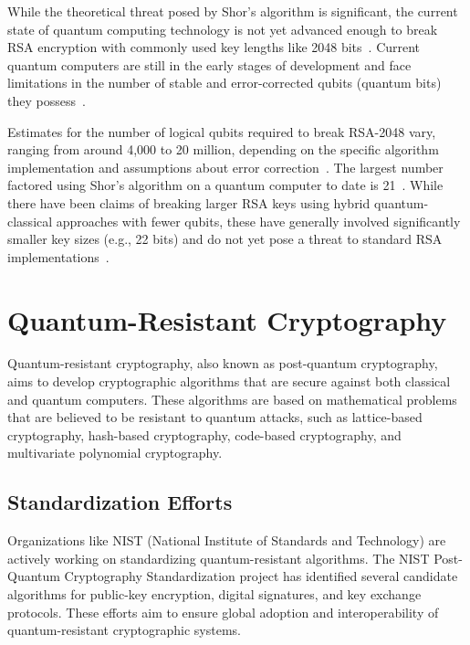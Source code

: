 \documentclass[12pt,a4paper]{report}
\begin{document}
While the theoretical threat posed by Shor's algorithm is significant, the current state of quantum computing technology is not yet advanced enough to break RSA encryption with commonly used key lengths like 2048 bits~\cite{SpinQShor}. Current quantum computers are still in the early stages of development and face limitations in the number of stable and error-corrected qubits (quantum bits) they possess~\cite{CatoNetworks}.

Estimates for the number of logical qubits required to break RSA-2048 vary, ranging from around 4,000 to 20 million, depending on the specific algorithm implementation and assumptions about error correction~\cite{BTQHowFar}. The largest number factored using Shor's algorithm on a quantum computer to date is 21~\cite{SpinQShor}. While there have been claims of breaking larger RSA keys using hybrid quantum-classical approaches with fewer qubits, these have generally involved significantly smaller key sizes (e.g., 22 bits) and do not yet pose a threat to standard RSA implementations~\cite{FreemindtronicRSA}.

\section{Quantum-Resistant Cryptography}
Quantum-resistant cryptography, also known as post-quantum cryptography, aims to develop cryptographic algorithms that are secure against both classical and quantum computers. These algorithms are based on mathematical problems that are believed to be resistant to quantum attacks, such as lattice-based cryptography, hash-based cryptography, code-based cryptography, and multivariate polynomial cryptography.

\subsection{Standardization Efforts}
Organizations like NIST (National Institute of Standards and Technology) are actively working on standardizing quantum-resistant algorithms. The NIST Post-Quantum Cryptography Standardization project has identified several candidate algorithms for public-key encryption, digital signatures, and key exchange protocols. These efforts aim to ensure global adoption and interoperability of quantum-resistant cryptographic systems.
\end{document}
